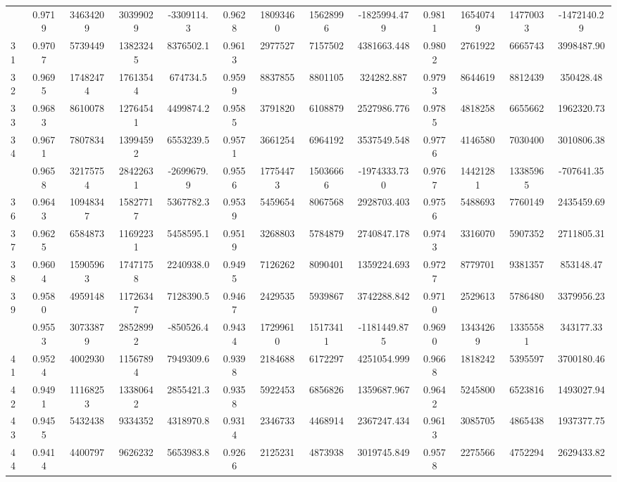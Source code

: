 \documentclass[
  12pt,
]{article}
\begin{document}
\begin{longtable}[t]{lcccccccccccc}
\addlinespace
30 & 0.9719 & 34634209 & 30399029 & -3309114.3 & 0.9628 & 18093460 & 15628996 & -1825994.479 & 0.9811 & 16540749 & 14770033 & -1472140.29\\
31 & 0.9707 & 5739449 & 13823245 & 8376502.1 & 0.9613 & 2977527 & 7157502 & 4381663.448 & 0.9802 & 2761922 & 6665743 & 3998487.90\\
32 & 0.9695 & 17482474 & 17613544 & 674734.5 & 0.9599 & 8837855 & 8801105 & 324282.887 & 0.9793 & 8644619 & 8812439 & 350428.48\\
33 & 0.9683 & 8610078 & 12764541 & 4499874.2 & 0.9585 & 3791820 & 6108879 & 2527986.776 & 0.9785 & 4818258 & 6655662 & 1962320.73\\
34 & 0.9671 & 7807834 & 13994592 & 6553239.5 & 0.9571 & 3661254 & 6964192 & 3537549.548 & 0.9776 & 4146580 & 7030400 & 3010806.38\\
\addlinespace
35 & 0.9658 & 32175754 & 28422631 & -2699679.9 & 0.9556 & 17754473 & 15036666 & -1974333.730 & 0.9767 & 14421281 & 13385965 & -707641.35\\
36 & 0.9643 & 10948347 & 15827717 & 5367782.3 & 0.9539 & 5459654 & 8067568 & 2928703.403 & 0.9756 & 5488693 & 7760149 & 2435459.69\\
37 & 0.9625 & 6584873 & 11692231 & 5458595.1 & 0.9519 & 3268803 & 5784879 & 2740847.178 & 0.9743 & 3316070 & 5907352 & 2711805.31\\
38 & 0.9604 & 15905963 & 17471758 & 2240938.0 & 0.9495 & 7126262 & 8090401 & 1359224.693 & 0.9727 & 8779701 & 9381357 & 853148.47\\
39 & 0.9580 & 4959148 & 11726347 & 7128390.5 & 0.9467 & 2429535 & 5939867 & 3742288.842 & 0.9710 & 2529613 & 5786480 & 3379956.23\\
\addlinespace
40 & 0.9553 & 30733879 & 28528992 & -850526.4 & 0.9434 & 17299610 & 15173411 & -1181449.875 & 0.9690 & 13434269 & 13355581 & 343177.33\\
41 & 0.9524 & 4002930 & 11567894 & 7949309.6 & 0.9398 & 2184688 & 6172297 & 4251054.999 & 0.9668 & 1818242 & 5395597 & 3700180.46\\
42 & 0.9491 & 11168253 & 13380642 & 2855421.3 & 0.9358 & 5922453 & 6856826 & 1359687.967 & 0.9642 & 5245800 & 6523816 & 1493027.94\\
43 & 0.9455 & 5432438 & 9334352 & 4318970.8 & 0.9314 & 2346733 & 4468914 & 2367247.434 & 0.9613 & 3085705 & 4865438 & 1937377.75\\
44 & 0.9414 & 4400797 & 9626232 & 5653983.8 & 0.9266 & 2125231 & 4873938 & 3019745.849 & 0.9578 & 2275566 & 4752294 & 2629433.82\\

\end{longtable}
\end{document}

